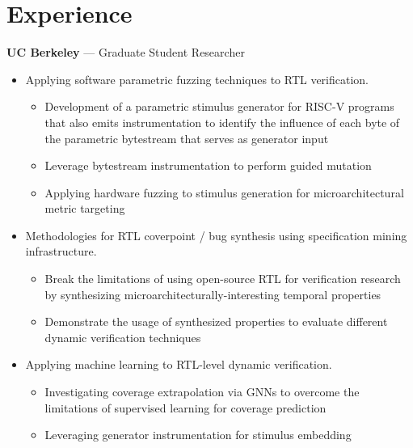 \documentclass[10pt]{article}
\begin{document}
\section{Experience}
 \textbf{UC Berkeley} --- Graduate Student Researcher
\begin{itemize}
    \item Applying software parametric fuzzing techniques to RTL verification.
    \begin{itemize}
        \item Development of a parametric stimulus generator for RISC-V programs that also emits instrumentation to identify the influence of each byte of the parametric bytestream that serves as generator input
        \item Leverage bytestream instrumentation to perform guided mutation
        \item Applying hardware fuzzing to stimulus generation for microarchitectural metric targeting
    \end{itemize}
    \item Methodologies for RTL coverpoint / bug synthesis using specification mining infrastructure.
    \begin{itemize}
        \item Break the limitations of using open-source RTL for verification research by synthesizing microarchitecturally-interesting temporal properties
        \item Demonstrate the usage of synthesized properties to evaluate different dynamic verification techniques
    \end{itemize}
    \item Applying machine learning to RTL-level dynamic verification.
    \begin{itemize}
        \item Investigating coverage extrapolation via GNNs to overcome the limitations of supervised learning for coverage prediction
        \item Leveraging generator instrumentation for stimulus embedding

\end{itemize}
\end{itemize}
\end{document}

